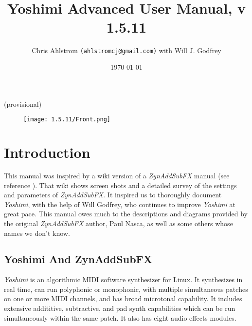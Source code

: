 \documentclass[
 11pt,
 twoside,
 a4paper,
 final                                 %
]{article}
\begin{document}
\title{Yoshimi Advanced User Manual, v 1.5.11}
\author{Chris Ahlstrom \texttt{(ahlstromcj@gmail.com)} with Will J. Godfrey}
\date{\today}
\maketitle
(provisional)
\begin{figure}[H]
   \centering
   \texttt{[image: 1.5.11/Front.png]}
\end{figure}

\clearpage                             %

\tableofcontents
\listoffigures                         %
\listoftables                          %

%

\setlength{\parindent}{2em}
\setlength{\parskip}{1ex plus 0.5ex minus 0.2ex}

\section{Introduction}
\label{sec:introduction}

   This manual was inspired by a wiki version of a
   \textsl{ZynAddSubFX} manual (see reference \cite{zynwiki}).  That wiki
   shows screen shots and a
   detailed survey of the settings and parameters of \textsl{ZynAddSubFX}.  It
   inspired us to thoroughly document \textsl{Yoshimi}, with the help of
   Will Godfrey, who continues to improve \textsl{Yoshimi} at great pace.
   This manual owes much to the descriptions and diagrams provided by the
   original \textsl{ZynAddSubFX} author, Paul Nasca, as well as some others
   whose names we don't know.

\subsection{Yoshimi And ZynAddSubFX}
\label{subsec:introduction_yoshimi_vs_zyn}

   \textsl{Yoshimi} is an algorithmic MIDI software synthesizer for Linux.
   It synthesizes in real time, can run polyphonic or monophonic, with multiple
   simultaneous patches on one or more MIDI channels, and has broad microtonal
   capability. It includes extensive addititive, subtractive,
   and pad synth capabilities which can be run simultaneously within the
   same patch.  It also has eight audio effects modules.
\end{document}
